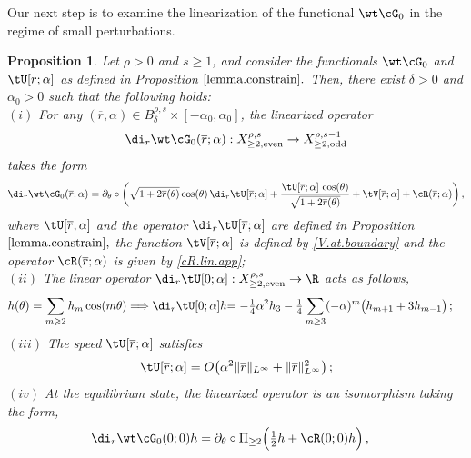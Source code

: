 \documentclass[a4paper,reqno,10pt]{article}
\newtheorem{pro}{Proposition}[section]
\newcommand{\pa}{\partial}
\begin{document}
Our next step is to examine the linearization of the functional $\wt\cG_{0}$ in the regime of small perturbations.
\begin{pro}\label{lemma.constrain1}
	Let $\rho>0$ and $s\geq 1$, and consider the functionals $\wt\cG_{0}$ and $\tU[r;\alpha]$ as defined in Proposition $\ref{lemma.constrain}.$ Then, there exist $\delta>0$ and  $\alpha_{0}>0$ such that the following holds:
	\\[1mm]
	$(i)$ 
	 For any $(\overline r,\alpha) \in B_\delta^{\rho,s} \times [-\alpha_{0},\alpha_{0}]$, the linearized operator $$\di_{r} \wt\cG_{0}(\overline r;\alpha):X_{\geq 2,\rm even}^{\rho,s}\to X_{\geq 2,\rm odd}^{\rho,s-1} 
     $$
     takes the form\begin{equation}\label{linear.with.constrain}
		\di_{r} \wt\cG_{0}(\overline r;\alpha) = \pa_{\theta}\circ \bigg(  \sqrt{1+2\overline r(\theta)} \cos(\theta) \, \di_{r}\tU[\overline r;\alpha] + \frac{\tU[\overline r;\alpha] \, \cos(\theta)}{\sqrt{1+2\overline r(\theta)}} + \tV[\overline r;\alpha] + \cR(\overline r;\alpha) \bigg) \,,
	\end{equation}
	 where $\tU[\overline r;\alpha]$ and the operator $\di_{r}\tU[\overline r;\alpha]$ are defined in Proposition $\ref{lemma.constrain},$ the function $\tV[\overline r;\alpha]$ is defined by \eqref{V.at.boundary} and the operator $\cR(\overline r;\alpha)$ is given by \eqref{cR.lin.app};
	\\[1mm]
	$(ii)$ The linear operator $\di_{r} \tU[0;\alpha]: X_{\geq 2,\rm even}^{\rho,s} \to \R$  acts as follows, 
	\begin{align*}
	h(\theta)=\sum_{m\geqslant2}h_m \cos(m\theta)\Longrightarrow 	\di_{r} \tU[0;\alpha] h 
        &{=-\tfrac14{\alpha^2}h_3  -\tfrac{1}{4}\sum_{m\geq 3} (-\alpha)^{m}\big(h_{m+1}+3h_{m-1}\big)\,;}
	\end{align*}
    $(iii)$ The speed $\tU[\overline{r};\alpha]$ satisfies  $$	\tU[\overline{r};\alpha]=O\big(\alpha^2\|\overline{r}\|_{L^\infty}+\|\overline{r}\|_{L^\infty}^2\big)\,;$$
	  $(iv)$ At the  equilibrium state, the linearized operator is an isomorphism   taking the form,
	\begin{align}
		\di_{r} \wt\cG_{0}(0;0) h & = \pa_{\theta}\circ \Pi_{\geq 2}\Big(  \tfrac12 h  + \cR(0;0)h \Big) \,, \label{bristol.0}

\end{align}
\end{pro}
\end{document}
